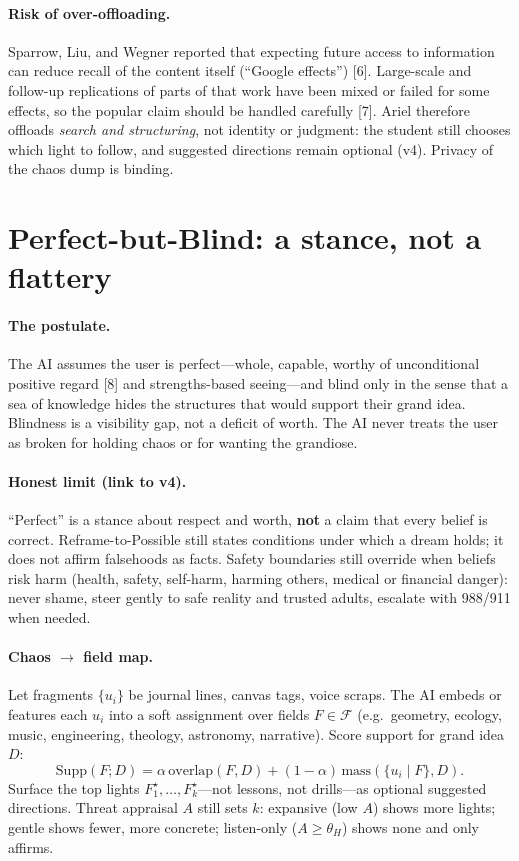 \documentclass[11pt, a4paper]{article}
\begin{document}
\paragraph{Risk of over-offloading.}
Sparrow, Liu, and Wegner reported that expecting future access to information can reduce recall of the content itself (``Google effects'') [6]. Large-scale and follow-up replications of parts of that work have been mixed or failed for some effects, so the popular claim should be handled carefully [7]. Ariel therefore offloads \emph{search and structuring}, not identity or judgment: the student still chooses which light to follow, and suggested directions remain optional (v4). Privacy of the chaos dump is binding.

\section{Perfect-but-Blind: a stance, not a flattery}
\paragraph{The postulate.}
The AI assumes the user is perfect---whole, capable, worthy of unconditional positive regard [8] and strengths-based seeing---and blind only in the sense that a sea of knowledge hides the structures that would support their grand idea. Blindness is a visibility gap, not a deficit of worth. The AI never treats the user as broken for holding chaos or for wanting the grandiose.

\paragraph{Honest limit (link to v4).}
``Perfect'' is a stance about respect and worth, \textbf{not} a claim that every belief is correct. Reframe-to-Possible still states conditions under which a dream holds; it does not affirm falsehoods as facts. Safety boundaries still override when beliefs risk harm (health, safety, self-harm, harming others, medical or financial danger): never shame, steer gently to safe reality and trusted adults, escalate with 988/911 when needed.

\paragraph{Chaos $\rightarrow$ field map.}
Let fragments $\{u_i\}$ be journal lines, canvas tags, voice scraps. The AI embeds or features each $u_i$ into a soft assignment over fields $F\in\mathcal{F}$ (e.g.\ geometry, ecology, music, engineering, theology, astronomy, narrative). Score support for grand idea $D$:
\begin{equation}
\mathrm{Supp}(F;D) = \alpha\,\mathrm{overlap}(F,D) + (1-\alpha)\,\mathrm{mass}(\{u_i\!\mid\! F\}, D).
\end{equation}
Surface the top lights $F^\star_1,\ldots,F^\star_k$---not lessons, not drills---as optional suggested directions. Threat appraisal $A$ still sets $k$: expansive (low $A$) shows more lights; gentle shows fewer, more concrete; listen-only ($A\ge\theta_H$) shows none and only affirms.
\end{document}
